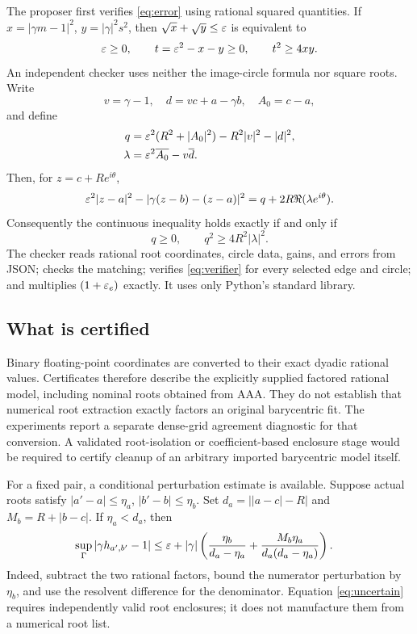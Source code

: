 \documentclass[11pt]{article}
\theoremstyle{definition}\newtheorem{definition}[theorem]{Definition}
\begin{document}
The proposer first verifies \eqref{eq:error} using rational squared quantities. If $x=|\gamma m-1|^2$, $y=|\gamma|^2s^2$, then $\sqrt{x}+\sqrt{y}\le\varepsilon$ is equivalent to
\begin{equation}
 \varepsilon\ge0,\qquad t=\varepsilon^2-x-y\ge0,\qquad t^2\ge4xy.\label{eq:radicals}
\end{equation}
An independent checker uses neither the image-circle formula nor square roots. Write
\[
 v=\gamma-1,\quad d=vc+a-\gamma b,\quad A_0=c-a,
\]
and define
\begin{align}
 q&=\varepsilon^2(R^2+|A_0|^2)-R^2|v|^2-|d|^2,\\
 \lambda&=\varepsilon^2\overline{A_0}-v\overline d.
\end{align}
Then, for $z=c+Re^{i\theta}$,
\begin{equation}
 \varepsilon^2|z-a|^2-|\gamma(z-b)-(z-a)|^2
 =q+2R\Re(\lambda e^{i\theta}).\label{eq:fourier}
\end{equation}
Consequently the continuous inequality holds exactly if and only if
\begin{equation}
 q\ge0,\qquad q^2\ge4R^2|\lambda|^2.\label{eq:verifier}
\end{equation}
The checker reads rational root coordinates, circle data, gains, and errors from JSON; checks the matching; verifies \eqref{eq:verifier} for every selected edge and circle; and multiplies $(1+\varepsilon_e)$ exactly. It uses only Python's standard library.

\subsection{What is certified}
Binary floating-point coordinates are converted to their exact dyadic rational values. Certificates therefore describe the explicitly supplied factored rational model, including nominal roots obtained from AAA. They do not establish that numerical root extraction exactly factors an original barycentric fit. The experiments report a separate dense-grid agreement diagnostic for that conversion. A validated root-isolation or coefficient-based enclosure stage would be required to certify cleanup of an arbitrary imported barycentric model itself.

For a fixed pair, a conditional perturbation estimate is available. Suppose actual roots satisfy $|a'-a|\le\eta_a$, $|b'-b|\le\eta_b$. Set $d_a=\big||a-c|-R\big|$ and $M_b=R+|b-c|$. If $\eta_a<d_a$, then
\begin{equation}
 \begin{aligned}
 \sup_\Gamma|\gamma h_{a',b'}-1|
 &\le \varepsilon+|\gamma|\left(\frac{\eta_b}{d_a-\eta_a}
       +\frac{M_b\eta_a}{d_a(d_a-\eta_a)}\right).
\end{aligned}\label{eq:uncertain}
\end{equation}
Indeed, subtract the two rational factors, bound the numerator perturbation by $\eta_b$, and use the resolvent difference for the denominator. Equation \eqref{eq:uncertain} requires independently valid root enclosures; it does not manufacture them from a numerical root list.
\end{document}
